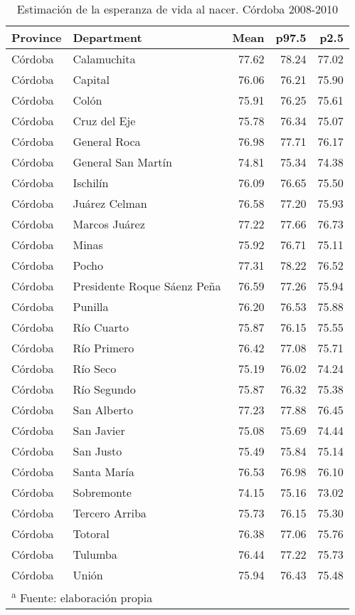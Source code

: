 \documentclass[12pt,]{article}
\begin{document}
\begin{table}

\caption{\label{tab:table_e0}Estimación de la esperanza de vida al nacer. Córdoba 2008-2010}
\centering
\begin{tabular}[t]{l|l|r|r|r}
\hline
Province & Department & Mean & p97.5 & p2.5\\
\hline
Córdoba & Calamuchita & 77.62 & 78.24 & 77.02\\
\hline
Córdoba & Capital & 76.06 & 76.21 & 75.90\\
\hline
Córdoba & Colón & 75.91 & 76.25 & 75.61\\
\hline
Córdoba & Cruz del Eje & 75.78 & 76.34 & 75.07\\
\hline
Córdoba & General Roca & 76.98 & 77.71 & 76.17\\
\hline
Córdoba & General San Martín & 74.81 & 75.34 & 74.38\\
\hline
Córdoba & Ischilín & 76.09 & 76.65 & 75.50\\
\hline
Córdoba & Juárez Celman & 76.58 & 77.20 & 75.93\\
\hline
Córdoba & Marcos Juárez & 77.22 & 77.66 & 76.73\\
\hline
Córdoba & Minas & 75.92 & 76.71 & 75.11\\
\hline
Córdoba & Pocho & 77.31 & 78.22 & 76.52\\
\hline
Córdoba & Presidente Roque Sáenz Peña & 76.59 & 77.26 & 75.94\\
\hline
Córdoba & Punilla & 76.20 & 76.53 & 75.88\\
\hline
Córdoba & Río Cuarto & 75.87 & 76.15 & 75.55\\
\hline
Córdoba & Río Primero & 76.42 & 77.08 & 75.71\\
\hline
Córdoba & Río Seco & 75.19 & 76.02 & 74.24\\
\hline
Córdoba & Río Segundo & 75.87 & 76.32 & 75.38\\
\hline
Córdoba & San Alberto & 77.23 & 77.88 & 76.45\\
\hline
Córdoba & San Javier & 75.08 & 75.69 & 74.44\\
\hline
Córdoba & San Justo & 75.49 & 75.84 & 75.14\\
\hline
Córdoba & Santa María & 76.53 & 76.98 & 76.10\\
\hline
Córdoba & Sobremonte & 74.15 & 75.16 & 73.02\\
\hline
Córdoba & Tercero Arriba & 75.73 & 76.15 & 75.30\\
\hline
Córdoba & Totoral & 76.38 & 77.06 & 75.76\\
\hline
Córdoba & Tulumba & 76.44 & 77.22 & 75.73\\
\hline
Córdoba & Unión & 75.94 & 76.43 & 75.48\\
\hline
\multicolumn{5}{l}{\textsuperscript{a} Fuente: elaboración propia}\\
\end{tabular}
\end{table}
\end{document}
